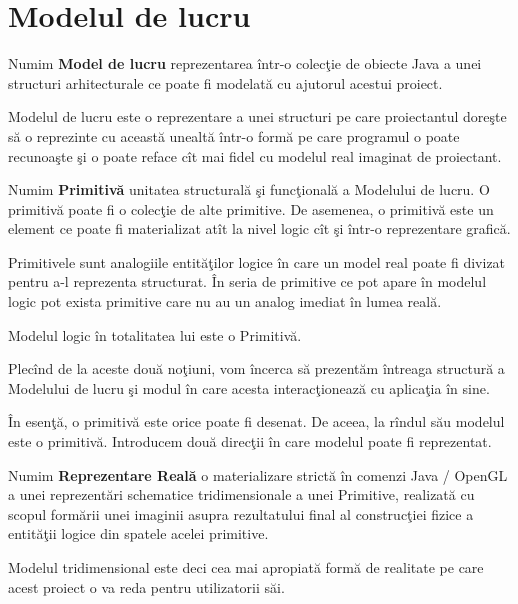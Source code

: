 \section{Modelul de lucru}

\begin{definition}
\label{define:model}
Numim \textbf{Model de lucru} reprezentarea într-o colecţie de obiecte Java a 
unei structuri arhitecturale ce poate fi modelată cu ajutorul acestui proiect.
\end{definition}

Modelul de lucru este o reprezentare a unei structuri pe care proiectantul 
doreşte să o reprezinte cu această unealtă într-o formă pe care programul o 
poate recunoaşte şi o poate reface cît mai fidel cu modelul real imaginat de 
proiectant.

\begin{definition}
\label{define:primitive}
Numim \textbf{Primitivă} unitatea structurală şi funcţională a Modelului de 
lucru. O primitivă poate fi o colecţie de alte primitive. De asemenea, o 
primitivă este un element ce poate fi materializat atît la nivel logic cît şi 
într-o reprezentare grafică.
\end{definition}

Primitivele sunt analogiile entităţilor logice în care un model real poate fi 
divizat pentru a-l reprezenta structurat. În seria de primitive ce pot apare în 
modelul logic pot exista primitive care nu au un analog imediat în lumea reală.

\begin{statement}
Modelul logic în totalitatea lui este o Primitivă.
\end{statement}

Plecînd de la aceste două noţiuni, vom încerca să prezentăm întreaga structură 
a Modelului de lucru şi modul în care acesta interacţionează cu aplicaţia în 
sine.

În esenţă, o primitivă este orice poate fi desenat. De aceea, la rîndul său 
modelul este o primitivă. Introducem două direcţii în care modelul poate fi 
reprezentat.

\begin{definition}
\label{define:realRender}
Numim \textbf{Reprezentare Reală} o materializare strictă în comenzi 
Java / OpenGL a unei reprezentări schematice tridimensionale a unei Primitive, 
realizată cu scopul formării unei imaginii asupra rezultatului final al 
construcţiei fizice a entităţii logice din spatele acelei primitive. 
\end{definition} Modelul tridimensional este deci cea mai apropiată formă de 
realitate pe care acest proiect o va reda pentru utilizatorii săi.

